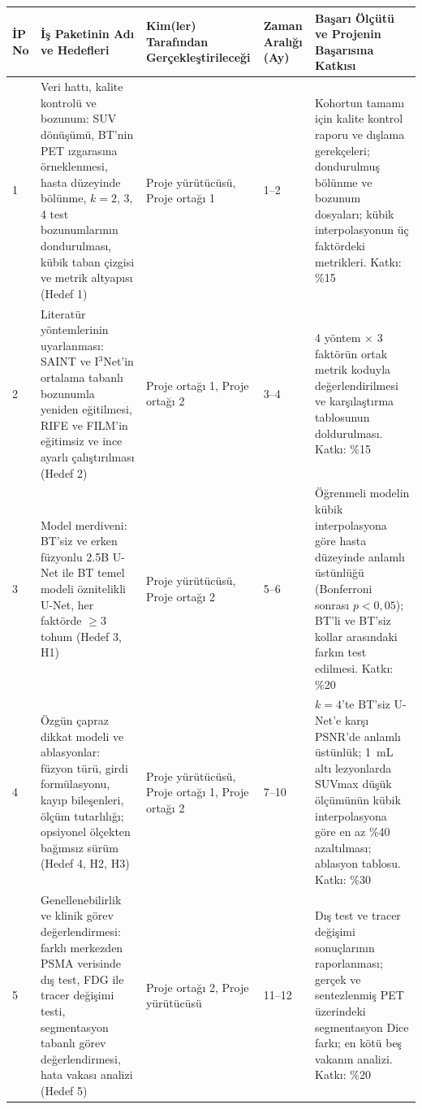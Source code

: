 \documentclass[11pt,a4paper]{article}
\begin{document}
{\small
\begin{longtable}{@{}L{0.6cm}L{4.2cm}L{3.0cm}L{1.4cm}L{4.3cm}@{}}
\toprule
İP No & İş Paketinin Adı ve Hedefleri & Kim(ler) Tarafından Gerçekleştirileceği & Zaman Aralığı (Ay)
  & Başarı Ölçütü ve Projenin Başarısına Katkısı \\
\midrule
{} & Veri hattı, kalite kontrolü ve bozunum: SUV dönüşümü, BT'nin PET ızgarasına örneklenmesi,
  hasta düzeyinde bölünme, $k = 2$, 3, 4 test bozunumlarının dondurulması, kübik taban çizgisi ve
  metrik altyapısı (Hedef 1)
  & Proje yürütücüsü, Proje ortağı 1 & 1--2
  & Kohortun tamamı için kalite kontrol raporu ve dışlama gerekçeleri; dondurulmuş bölünme ve
  bozunum dosyaları; kübik interpolasyonun üç faktördeki metrikleri. Katkı: \%15 \\
2 & Literatür yöntemlerinin uyarlanması: SAINT ve I$^3$Net'in ortalama tabanlı bozunumla yeniden
  eğitilmesi, RIFE ve FILM'in eğitimsiz ve ince ayarlı çalıştırılması (Hedef 2)
  & Proje ortağı 1, Proje ortağı 2 & 3--4
  & 4 yöntem $\times$ 3 faktörün ortak metrik koduyla değerlendirilmesi ve karşılaştırma
  tablosunun doldurulması. Katkı: \%15 \\
3 & Model merdiveni: BT'siz ve erken füzyonlu 2.5B U-Net ile BT temel modeli öznitelikli U-Net,
  her faktörde $\geq 3$ tohum (Hedef 3, H1)
  & Proje yürütücüsü, Proje ortağı 2 & 5--6
  & Öğrenmeli modelin kübik interpolasyona göre hasta düzeyinde anlamlı üstünlüğü (Bonferroni
  sonrası $p < 0{,}05$); BT'li ve BT'siz kollar arasındaki farkın test edilmesi. Katkı: \%20 \\
4 & Özgün çapraz dikkat modeli ve ablasyonlar: füzyon türü, girdi formülasyonu, kayıp
  bileşenleri, ölçüm tutarlılığı; opsiyonel ölçekten bağımsız sürüm (Hedef 4, H2, H3)
  & Proje yürütücüsü, Proje ortağı 1, Proje ortağı 2 & 7--10
  & $k = 4$'te BT'siz U-Net'e karşı PSNR'de anlamlı üstünlük; 1~mL altı lezyonlarda SUVmax
  düşük ölçümünün kübik interpolasyona göre en az \%40 azaltılması; ablasyon tablosu.
  Katkı: \%30 \\
5 & Genellenebilirlik ve klinik görev değerlendirmesi: farklı merkezden PSMA verisinde dış test,
  FDG ile tracer değişimi testi, segmentasyon tabanlı görev değerlendirmesi, hata vakası analizi
  (Hedef 5)
  & Proje ortağı 2, Proje yürütücüsü & 11--12
  & Dış test ve tracer değişimi sonuçlarının raporlanması; gerçek ve sentezlenmiş PET üzerindeki
  segmentasyon Dice farkı; en kötü beş vakanın analizi. Katkı: \%20 \\
\bottomrule
\end{longtable}
}
\end{document}
